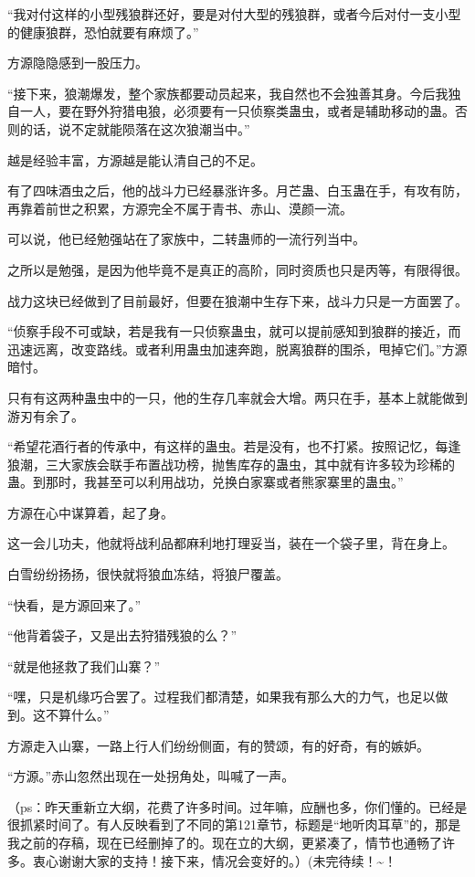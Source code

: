 \begin{this_body}
“我对付这样的小型残狼群还好，要是对付大型的残狼群，或者今后对付一支小型的健康狼群，恐怕就要有麻烦了。”

方源隐隐感到一股压力。

“接下来，狼潮爆发，整个家族都要动员起来，我自然也不会独善其身。今后我独自一人，要在野外狩猎电狼，必须要有一只侦察类蛊虫，或者是辅助移动的蛊。否则的话，说不定就能陨落在这次狼潮当中。”

越是经验丰富，方源越是能认清自己的不足。

有了四味酒虫之后，他的战斗力已经暴涨许多。月芒蛊、白玉蛊在手，有攻有防，再靠着前世之积累，方源完全不属于青书、赤山、漠颜一流。

可以说，他已经勉强站在了家族中，二转蛊师的一流行列当中。

之所以是勉强，是因为他毕竟不是真正的高阶，同时资质也只是丙等，有限得很。

战力这块已经做到了目前最好，但要在狼潮中生存下来，战斗力只是一方面罢了。

“侦察手段不可或缺，若是我有一只侦察蛊虫，就可以提前感知到狼群的接近，而迅速远离，改变路线。或者利用蛊虫加速奔跑，脱离狼群的围杀，甩掉它们。”方源暗忖。

只有有这两种蛊虫中的一只，他的生存几率就会大增。两只在手，基本上就能做到游刃有余了。

“希望花酒行者的传承中，有这样的蛊虫。若是没有，也不打紧。按照记忆，每逢狼潮，三大家族会联手布置战功榜，抛售库存的蛊虫，其中就有许多较为珍稀的蛊。到那时，我甚至可以利用战功，兑换白家寨或者熊家寨里的蛊虫。”

方源在心中谋算着，起了身。

这一会儿功夫，他就将战利品都麻利地打理妥当，装在一个袋子里，背在身上。

白雪纷纷扬扬，很快就将狼血冻结，将狼尸覆盖。

“快看，是方源回来了。”

“他背着袋子，又是出去狩猎残狼的么？”

“就是他拯救了我们山寨？”

“嘿，只是机缘巧合罢了。过程我们都清楚，如果我有那么大的力气，也足以做到。这不算什么。”

方源走入山寨，一路上行人们纷纷侧面，有的赞颂，有的好奇，有的嫉妒。

“方源。”赤山忽然出现在一处拐角处，叫喊了一声。

（ps：昨天重新立大纲，花费了许多时间。过年嘛，应酬也多，你们懂的。已经是很抓紧时间了。有人反映看到了不同的第121章节，标题是“地听肉耳草”的，那是我之前的存稿，现在已经删掉了的。现在立的大纲，更紧凑了，情节也通畅了许多。衷心谢谢大家的支持！接下来，情况会变好的。）(未完待续！\~{}！

\end{this_body}

